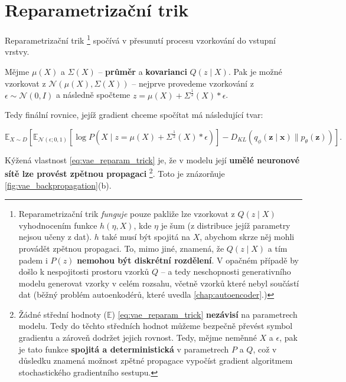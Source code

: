 \section{Reparametrizační trik}
\label{sec:reparametrization_trick}
Reparametrizační trik
\footnote{Reparametrizační trik \emph{funguje} pouze pakliže lze vzorkovat z $Q(z\mid X)$ vyhodnocením funkce $h(\eta, X)$, kde $\eta$ je šum (z distribuce jejíž parametry nejsou učeny z dat). $h$ také musí být spojitá na $X$, abychom skrze něj mohli provádět zpětnou propagaci.
To, mimo jiné, znamená, že $Q(z\mid X)$ a tím padem i $P(z)$ \textbf{nemohou být diskrétní rozdělení}. V opačném případě by došlo k nespojitosti prostoru vzorků $Q$ – a tedy neschopnosti generativního modelu generovat vzorky v celém rozsahu, včetně vzorků které nebyl součástí dat (běžný problém autoenkodérů, které uvedla \autoref{chap:autoencoder}.)}
spočívá v přesunutí procesu vzorkování do vstupní vrstvy.

Mějme $\mu(X)$ a $\Sigma(X)$ – \textbf{průměr} a \textbf{kovarianci} $Q(z\mid X)$.
Pak je možné vzorkovat z $\mathcal{N}(\mu(X), \Sigma(X))$ – nejprve provedeme vzorkování z $\epsilon \sim \mathcal{N}(0, I)$ a následně spočteme $z = \mu(X) + \Sigma^{\frac{1}{2}}(X) * \epsilon$.

Tedy finální rovnice, jejíž gradient chceme spočítat má následující tvar:

\begin{equation} \label{eq:vae_reparam_trick}
    \mathds{E}_{X \sim D} \left[ \mathds{E}_{\mathcal{N}(\epsilon; 0, 1)} \left[ \log P(X\mid z = \mu(X) + \Sigma^{\frac{1}{2}} (X) * \epsilon) \right] -  D_{KL}(q_\phi(\textbf{z}\mid\textbf{x})\parallel p_\theta(\textbf{z})) \right].
\end{equation}


Kýžená vlastnost \autoref{eq:vae_reparam_trick} je, že v modelu její \textbf{umělé neuronové sítě lze provést zpětnou propagaci}
\footnote{Žádné střední hodnoty ($\mathds{E}$) \autoref{eq:vae_reparam_trick} \textbf{nezávisí} na parametrech modelu. Tedy do těchto středních hodnot můžeme bezpečně převést symbol gradientu a zároveň dodržet jejich rovnost. 
Tedy, mějme neměnné $X$ a $\epsilon$, pak je tato funkce \textbf{spojitá a deterministická} v parametrech $P$ a $Q$, což v důsledku znamená možnost zpětné propagace vypočíst gradient algoritmem stochastického gradientního sestupu.}. 
Toto je znázorňuje \autoref{fig:vae_backpropagation}(b).

